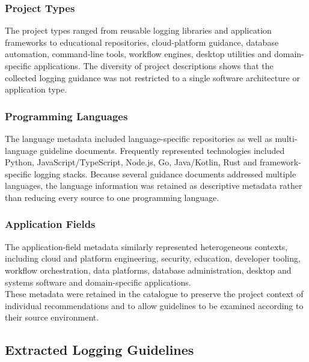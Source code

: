 \subsubsection{Project Types}

The project types ranged from reusable logging libraries and application frameworks
to educational repositories, cloud-platform guidance, database automation,
command-line tools, workflow engines, desktop utilities and domain-specific
applications. The diversity of project descriptions shows that the collected
logging guidance was not restricted to a single software architecture or
application type.


\subsubsection{Programming Languages}

The language metadata included language-specific repositories as well as
multi-language guideline documents. Frequently represented technologies included
Python, JavaScript/TypeScript, Node.js, Go, Java/Kotlin, Rust and
framework-specific logging stacks. Because several guidance documents addressed
multiple languages, the language information was retained as descriptive metadata
rather than reducing every source to one programming language.


\subsubsection{Application Fields}

The application-field metadata similarly represented heterogeneous contexts,
including cloud and platform engineering, security, education, developer tooling,
workflow orchestration, data platforms, database administration, desktop and
systems software and domain-specific applications.
\\
These metadata were retained in the catalogue to preserve the project context of
individual recommendations and to allow guidelines to be examined according to
their source environment.


\subsection{Extracted Logging Guidelines}


